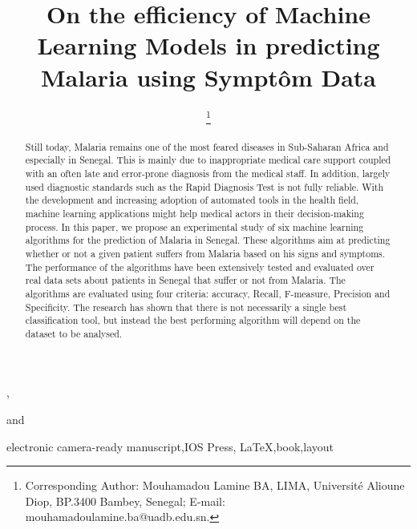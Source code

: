 \documentclass{IOS-Book-Article}
\def\hb{\hbox to 10.7 cm{}}
\def\hb{\hbox to 10.7 cm{}}
\begin{document}
\pagestyle{headings}
\def\thepage{}

\begin{frontmatter}              %

\title{On the efficiency of Machine Learning Models in predicting Malaria using Sympt\^om Data}

\markboth{}{January 2020\hb}

\author{ },
\author{ 
\thanks{Corresponding Author: Mouhamadou Lamine BA, LIMA, Universit\'e Alioune Diop,
BP.3400 Bambey, Senegal; E-mail: mouhamadoulamine.ba@uadb.edu.sn.}}
and
\author{ }

\address{LIMA, Universit\'e Alioune Diop, Bambey, Senegal}

\begin{abstract}
Still today, Malaria remains one of the most feared diseases in Sub-Saharan Africa and especially in Senegal. This is mainly due to inappropriate medical care support coupled with an often late and error-prone diagnosis from the medical staff. In addition, largely used diagnostic standards such as the Rapid Diagnosis Test is not fully reliable. With the development and increasing adoption of automated tools in the health field, machine learning applications might help medical actors in their decision-making process. In this paper, we propose an experimental study of six machine learning algorithms for the prediction of Malaria in Senegal. These algorithms aim at predicting whether or not a given patient suffers from Malaria based on his signs and symptoms. The performance of the algorithms have been extensively tested and evaluated over real data sets about patients in Senegal that suffer or not from Malaria. The algorithms are evaluated using four criteria: accuracy, Recall, F-measure, Precision and Specificity. The research has shown that there is not necessarily a single best classification tool, but instead the best performing algorithm will depend on the dataset to be analysed.
\end{abstract}

\begin{keyword}
electronic camera-ready manuscript\sep IOS Press\sep
\LaTeX\sep book\sep layout
\end{keyword}
\end{frontmatter}
\markboth{January 2020\hb}{January 2020\hb}














\end{document}
